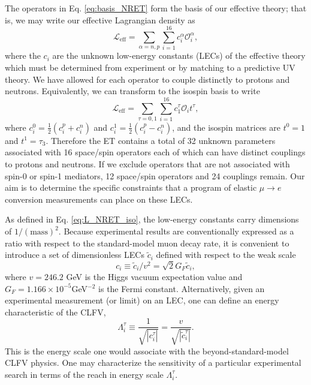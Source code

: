 \documentclass{book}[letterpaper,12pt]
\begin{document}
The operators in Eq. \ref{eq:basis_NRET} form the basis of our effective theory; that is, we may write our effective Lagrangian density as
\begin{equation}
\mathcal{L}_\mathrm{eff}=\sum_{\alpha=n,p}\sum_{i=1}^{16}c_i^{\alpha}\mathcal{O}_i^{\alpha},
\end{equation}
where the $c_i$ are the unknown low-energy constants (LECs) of the effective theory which must be determined from experiment or by matching to a predictive UV theory. We have allowed for each operator to couple distinctly to protons and neutrons. Equivalently, we can transform to the isospin basis to write
\begin{equation}
\mathcal{L}_\mathrm{eff}=\sum_{\tau=0,1}\sum_{i=1}^{16}c^{\tau}_1\mathcal{O}_it^{\tau},
\label{eq:L_NRET_iso}
\end{equation}
where $c^0_i=\frac{1}{2}\left(c_i^p+c_i^n\right)$ and $c_i^1=\frac{1}{2}\left(c_i^p-c_i^n\right)$, and the isospin matrices are $t^0=1$ and $t^1=\tau_3$. Therefore the ET contains a total of 32 unknown parameters associated with 16 space/spin operators each of which can have distinct couplings to protons and neutrons. If we exclude operators that are not associated with spin-0 or spin-1 mediators, 12 space/spin operators and 24 couplings remain. Our aim is to determine the specific constraints that a program of elastic $\mu\rightarrow e$ conversion measurements can place on these LECs.

As defined in Eq. \ref{eq:L_NRET_iso}, the low-energy constants carry dimensions of $1/(\mathrm{mass})^2$. Because experimental results are conventionally expressed as a ratio with respect to the standard-model muon decay rate, it is convenient to introduce a set of dimensionless LECs $\tilde{c}_i$ defined with respect to the weak scale
\begin{equation}
c_i\equiv \tilde{c}_i/v^2=\sqrt{2}G_F\tilde{c}_i,
\end{equation}
where $v=246.2$ GeV is the Higgs vacuum expectation value and $G_F=1.166\times 10^{-5}$GeV$^{-2}$ is the Fermi constant. Alternatively, given an experimental measurement (or limit) on an LEC, one can define an energy characteristic of the CLFV,
\begin{equation}
\Lambda_i^{\tau}\equiv\frac{1}{\sqrt{|c_i^{\tau}|}}=\frac{v}{\sqrt{|\tilde{c}_i^{\tau}|}}.
\end{equation}
This is the energy scale one would associate with the beyond-standard-model CLFV physics. One may characterize the sensitivity of a particular experimental search in terms of the reach in energy scale $\Lambda^\tau_i$.
\end{document}
